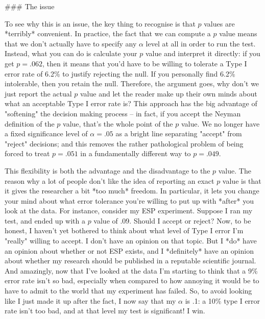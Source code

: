 ### The issue

To see why this is an issue, the key thing to recognise is that $p$ values are *terribly* convenient. In practice, the fact that we can compute a $p$ value means that we don't actually have to specify any  $\alpha$ level at all in order to run the test. Instead, what you can do is calculate your $p$ value and interpret it directly: if you get $p = .062$, then it means that you'd have to be willing to tolerate a Type I error rate of 6.2\% to justify rejecting the null. If you personally find 6.2\% intolerable, then you retain the null. Therefore, the argument goes, why don't we just report the actual $p$ value and let the reader make up their own minds about what an acceptable Type I error rate is? This approach has the big advantage of "softening" the decision making process -- in fact, if you accept the Neyman definition of the $p$ value, that's the whole point of the $p$ value. We no longer have a fixed significance level of $\alpha = .05$ as a bright line separating "accept" from "reject" decisions; and this removes the rather pathological problem of being forced to treat $p = .051$ in a fundamentally different way to $p = .049$. 

This flexibility is both the advantage and the disadvantage to the $p$ value. The reason why a lot of people don't like the idea of reporting an exact $p$ value is that it gives the researcher a bit *too much* freedom. In particular, it lets you change your mind about what error tolerance you're willing to put up with *after* you look at the data. For instance, consider my ESP experiment. Suppose I ran my test, and ended up with a $p$ value of .09. Should I accept or reject?  Now, to be honest, I haven't yet bothered to think about what level of Type I error I'm "really" willing to accept. I don't have an opinion on that topic. But I *do* have an opinion about whether or not ESP exists, and I *definitely* have an opinion about whether my research should be published in a reputable scientific journal. And amazingly, now that I've looked at the data I'm starting to think that a 9\% error rate isn't so bad, especially when compared to how annoying it would be to have to admit to the world that my experiment has failed. So, to avoid looking like I just made it up after the fact, I now say that my $\alpha$ is .1: a 10\% type I error rate isn't too bad, and at that level my test is significant! I win.

